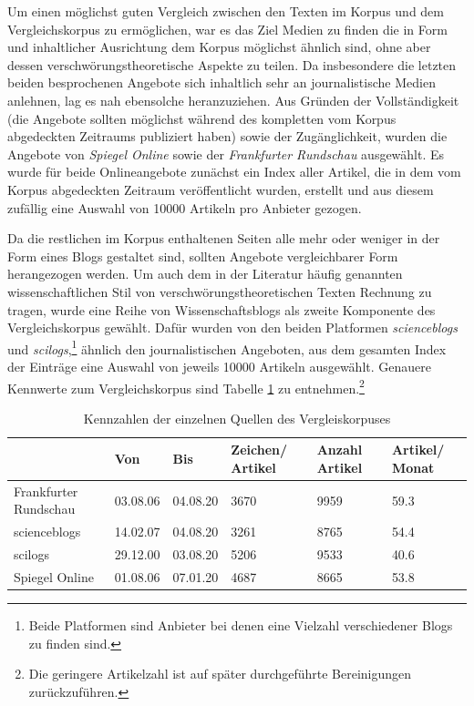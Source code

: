 \bigskip

Um einen möglichst guten Vergleich zwischen den Texten im Korpus und dem Vergleichskorpus zu ermöglichen, war es das Ziel Medien zu finden die in Form und inhaltlicher Ausrichtung dem Korpus möglichst ähnlich sind, ohne aber dessen verschwörungstheoretische Aspekte zu teilen.
Da insbesondere die letzten beiden besprochenen Angebote sich inhaltlich sehr an journalistische  Medien anlehnen, lag es nah ebensolche heranzuziehen.
Aus Gründen der Vollständigkeit (die Angebote sollten möglichst während des kompletten vom Korpus abgedeckten Zeitraums publiziert haben) sowie der Zugänglichkeit, wurden die Angebote von \textit{Spiegel Online} sowie der \textit{Frankfurter Rundschau} ausgewählt.
Es wurde für beide Onlineangebote zunächst ein Index aller Artikel, die in dem vom Korpus abgedeckten Zeitraum veröffentlicht wurden, erstellt und aus diesem zufällig eine Auswahl von 10000 Artikeln pro Anbieter gezogen.

Da die restlichen im Korpus enthaltenen Seiten alle mehr oder weniger in der Form eines Blogs gestaltet sind, sollten Angebote vergleichbarer Form herangezogen werden.
Um auch dem in der Literatur häufig genannten wissenschaftlichen Stil von verschwörungstheoretischen Texten Rechnung zu tragen, wurde eine Reihe von Wissenschaftsblogs als zweite Komponente des Vergleichskorpus gewählt.
Dafür wurden von den beiden Platformen \textit{scienceblogs} und \textit{scilogs},\footnote{Beide Platformen sind Anbieter bei denen eine Vielzahl verschiedener Blogs zu finden sind.} ähnlich den journalistischen Angeboten, aus dem gesamten Index der Einträge eine Auswahl von jeweils 10000 Artikeln ausgewählt.
Genauere Kennwerte zum Vergleichskorpus sind Tabelle \ref{comcorpus-stats} zu entnehmen.\footnote{Die geringere Artikelzahl ist auf später durchgeführte Bereinigungen zurückzuführen.}

\begin{table}
    \begin{center}
        \begin{tabularx}{\textwidth}{lXXXXX}
            \toprule
            & Von & Bis & Zeichen/ Artikel & Anzahl Artikel & Artikel/ Monat\\
            \midrule
            Frankfurter Rundschau & 03.08.06 & 04.08.20 & 3670 & 9959 & 59.3\\
            scienceblogs & 14.02.07 & 04.08.20 & 3261 & 8765 & 54.4\\
            scilogs & 29.12.00 & 03.08.20 & 5206 & 9533 & 40.6\\
            Spiegel Online & 01.08.06 & 07.01.20 & 4687 & 8665 & 53.8\\
            \bottomrule
        \end{tabularx}
        \caption{Kennzahlen der einzelnen Quellen des Vergleiskorpuses}
        \label{comcorpus-stats}
    \end{center}
\end{table}

